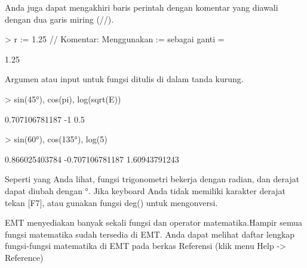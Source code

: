 \documentclass{report}
\begin{document}
\begin{eulernotebook}
\begin{eulercomment}
\begin{eulercomment}
\begin{eulercomment}
Anda juga dapat mengakhiri baris perintah dengan komentar yang diawali
dengan dua garis miring (//).
\end{eulercomment}
\begin{eulerprompt}
> r := 1.25 // Komentar: Menggunakan := sebagai ganti =
\end{eulerprompt}
\begin{euleroutput}
  1.25
\end{euleroutput}
\begin{eulercomment}
Argumen atau input untuk fungsi ditulis di dalam tanda kurung.
\end{eulercomment}
\begin{eulerprompt}
> sin(45°), cos(pi), log(sqrt(E))
\end{eulerprompt}
\begin{euleroutput}
  0.707106781187
  -1
  0.5
\end{euleroutput}
\begin{eulerprompt}
> sin(60°), cos(135°), log(5)
\end{eulerprompt}
\begin{euleroutput}
  0.866025403784
  -0.707106781187
  1.60943791243
\end{euleroutput}
\begin{eulercomment}
Seperti yang Anda lihat, fungsi trigonometri bekerja dengan radian,
dan derajat dapat diubah dengan °. Jika keyboard Anda tidak memiliki
karakter derajat tekan [F7], atau gunakan fungsi deg() untuk
mengonversi.

EMT menyediakan banyak sekali fungsi dan operator matematika.Hampir
semua fungsi matematika sudah tersedia di EMT. Anda dapat melihat
daftar lengkap fungsi-fungsi matematika di EMT pada berkas Referensi
(klik menu Help -\textgreater{} Reference)


\end{eulercomment}
\end{eulercomment}
\end{eulercomment}
\end{eulernotebook}
\end{document}
